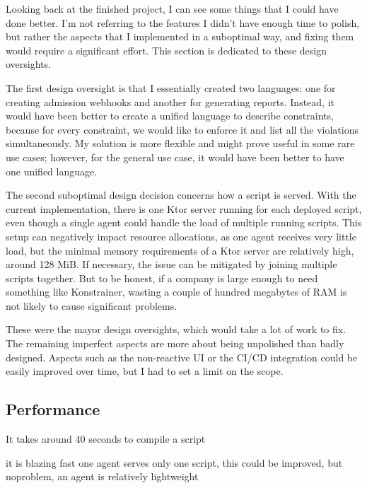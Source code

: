 Looking back at the finished project, I can see some things that I could have done better. I'm not referring to the features I didn't have enough time to polish, but rather the aspects that I implemented in a suboptimal way, and fixing them would require a significant effort. This section is dedicated to these design oversights.

The first design oversight is that I essentially created two languages: one for creating admission webhooks and another for generating reports. Instead, it would have been better to create a unified language to describe constraints, because for every constraint, we would like to enforce it and list all the violations simultaneously. My solution is more flexible and might prove useful in some rare use cases; however, for the general use case, it would have been better to have one unified language.

The second suboptimal design decision concerns how a script is served. With the current implementation, there is one Ktor server running for each deployed script, even though a single agent could handle the load of multiple running scripts. This setup can negatively impact resource allocations, as one agent receives very little load, but the minimal memory requirements of a Ktor server are relatively high, around 128 MiB. If necessary, the issue can be mitigated by joining multiple scripts together. But to be honest, if a company is large enough to need something like Konstrainer, wasting a couple of hundred megabytes of RAM is not likely to cause significant problems.

These were the mayor design oversights, which would take a lot of work to fix. The remaining imperfect aspects are more about being unpolished than badly designed. Aspects such as the non-reactive UI or the CI/CD integration could be easily improved over time, but I had to set a limit on the scope.

\subsection{Performance}

It takes around 40 seconds to compile a script

it is blazing fast
one agent serves only one script, this could be improved, but noproblem, an agent is relatively lightweight

